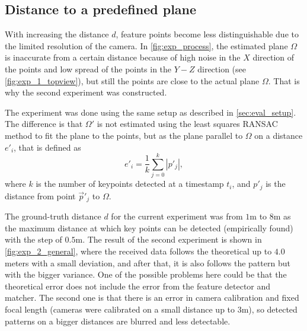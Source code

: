 \subsection{Distance to a predefined plane}
\label{sec:exp2}
With increasing the distance $d$, feature points become less distinguishable due to the limited resolution of the camera.
In \autoref{fig:exp_process}, the estimated plane $\Omega$ is inaccurate from a certain distance because of high noise in the $X$ direction of the points and low spread of the points in the $Y-Z$ direction (see \autoref{fig:exp_1_topview}), but still the points are close to the actual plane $\Omega$.
That is why the second experiment was constructed.

The experiment was done using the same setup as described in \autoref{sec:eval_setup}. 
The difference is that $\Omega'$ is not estimated using the least squares RANSAC method to fit the plane to the points, but as the plane parallel to $\Omega$ on a distance $e'_i$, that is defined as
\begin{equation}    
    e'_i = \frac{1}{k} \sum_{j=0}^{k}{|p'_j|},
\end{equation}
where $k$ is the number of keypoints detected at a timestamp $t_i$, and $p'_j$ is the distance from point $\vec{p}'_j$ to $\Omega$.


The ground-truth distance $d$ for the current experiment was from $1$m to $8$m as the maximum distance at which key points can be detected (empirically found) with the step of $0.5$m.
The result of the second experiment is shown in \autoref{fig:exp_2_general}, where the received data follows the theoretical up to $4.0$ meters with a small deviation, and after that, it is also follows the pattern but with the bigger variance.
One of the possible problems here could be that the theoretical error does not include the error from the feature detector and matcher.
The second one is that there is an error in camera calibration and fixed focal length (cameras were calibrated on a small distance up to $3$m), so detected patterns on a bigger distances are blurred and less detectable. 

